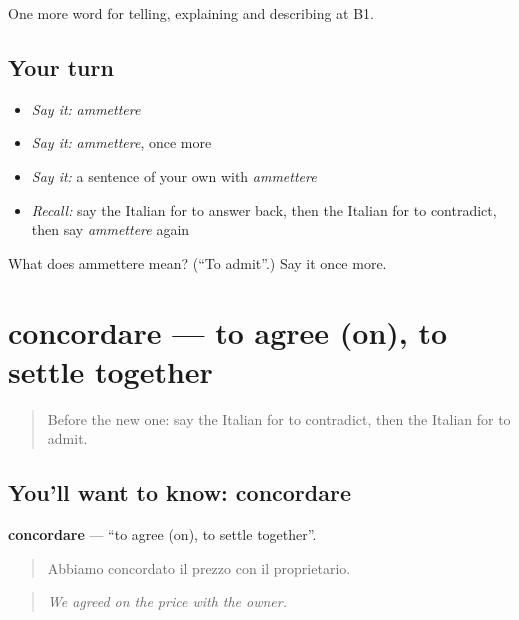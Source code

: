 \begin{grammarlens}[title={What you've built}]
One more word for telling, explaining and describing at B1.
\end{grammarlens}

\subsection*{Your turn}
\begin{itemize}
\raggedright
  \item \emph{Say it:} \emph{ammettere}
  \item \emph{Say it:} \emph{ammettere}, once more
  \item \emph{Say it:} a sentence of your own with \emph{ammettere}
  \item \emph{Recall:} say the Italian for to answer back, then the Italian for to contradict, then say \emph{ammettere} again
\end{itemize}

\begin{tcolorbox}[breakable,colback=teal!4,colframe=teal!35!black,title={Before you move on}]
What does ammettere mean? (\textquotedblleft{}To admit\textquotedblright{}.) Say it once more.
\end{tcolorbox}
\section[concordare]{concordare — to agree (on), to settle together}

\label{lesson:IT-C342-concordare}



\begin{quote}
Before the new one: say the Italian for to contradict, then the Italian for to admit.
\end{quote}

\subsection*{You'll want to know: concordare}
\textbf{concordare} — \textquotedblleft{}to agree (on), to settle together\textquotedblright{}.

\begin{quote}
Abbiamo concordato il prezzo con il proprietario.
\end{quote}

\begin{quote}
\emph{We agreed on the price with the owner.}
\end{quote}

